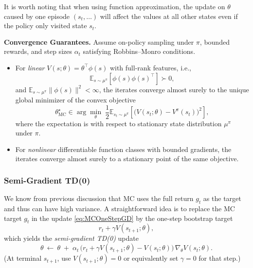 \documentclass[
]{book}
\theoremstyle{definition}
\theoremstyle{definition}
\theoremstyle{definition}
\theoremstyle{definition}
\theoremstyle{remark}
\begin{document}
It is worth noting that when using function approximation, the update on \(\theta\) caused by one episode \((s_t,\dots)\) will affect the values at all other states even if the policy only visited state \(s_t\).

\textbf{Convergence Guarantees.} Assume on-policy sampling under \(\pi\), bounded rewards, and step sizes \(\alpha_t\) satisfying Robbins--Monro conditions.

\begin{itemize}
\item
  For \emph{linear} \(V(s;\theta)=\theta^\top\phi(s)\) with full-rank features, i.e.,
  \[
  \mathbb{E}_{s \sim \mu^\pi} \left[ \phi(s) \phi(s)^\top \right] \succ 0,
  \]
  and \(\mathbb{E}_{s \sim \mu^\pi}\|\phi(s)\|^2<\infty\), the iterates converge almost surely to the unique global minimizer of the convex objective
  \begin{equation}
  \theta_{\text{MC}}^\star \in \arg\min_\theta \;  \frac{1}{2}\mathbb{E}_{s_t \sim \mu^\pi}\!\left[ \big(V(s_t;\theta)-V^\pi(s_t)\big)^2 \right],
  \label{eq:convergence-of-MC}
  \end{equation}
  where the expectation is with respect to stationary state distribution \(\mu^\pi\) under \(\pi\).
\item
  For \emph{nonlinear} differentiable function classes with bounded gradients, the iterates converge almost surely to a stationary point of the same objective.
\end{itemize}

\subsubsection{Semi-Gradient TD(0)}\label{semi-gradient-td0}

We know from previous discussion that MC uses the full return \(g_t\) as the target and thus can have high variance. A straightforward idea is to replace the MC target \(g_t\) in the update \eqref{eq:MCOneStepGD} by the one-step bootstrap target
\[
r_t + \gamma V(s_{t+1};\theta),
\]
which yields the \emph{semi-gradient TD(0)} update
\begin{equation}
\theta \ \leftarrow\ \theta \;+\; \alpha_t \,\big(r_t + \gamma V(s_{t+1};\theta) - V(s_t;\theta)\big)\, \nabla_\theta V(s_t;\theta).
\label{eq:SemiGradientTD0}
\end{equation}
(At terminal \(s_{t+1}\), use \(V(s_{t+1};\theta)=0\) or equivalently set \(\gamma=0\) for that step.)
\end{document}

